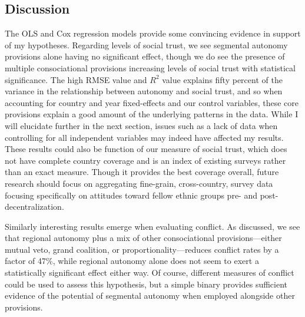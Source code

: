 \documentclass[12pt]{article}
\begin{document}
\subsection{Discussion} 
The OLS and Cox regression models provide some convincing evidence in support of my hypotheses. Regarding levels of social trust, we see segmental autonomy provisions alone having no significant effect, though we do see the presence of multiple consociational provisions increasing levels of social trust with statistical significance. The high RMSE value and $R^2$ value explains fifty percent of the variance in the relationship between autonomy and social trust, and so when accounting for country and year fixed-effects and our control variables, these core provisions explain a good amount of the underlying patterns in the data. While I will elucidate further in the next section, issues such as a lack of data when controlling for all independent variables may indeed have affected my results. These results could also be function of our measure of social trust, which does not have complete country coverage and is an index of existing surveys rather than an exact measure. Though it provides the best coverage overall, future research should focus on aggregating fine-grain, cross-country, survey data focusing specifically on attitudes toward fellow ethnic groups pre- and post-decentralization. 

Similarly interesting results emerge when evaluating conflict. As discussed, we see that regional autonomy plus a mix of other consociational provisions---either mutual veto, grand coalition, or proportionality---reduces conflict rates by a factor of 47\%, while regional autonomy alone does not seem to exert a statistically significant effect either way. Of course, different measures of conflict could be used to assess this hypothesis, but a simple binary provides sufficient evidence of the potential of segmental autonomy when employed alongside other provisions.  
\end{document}
